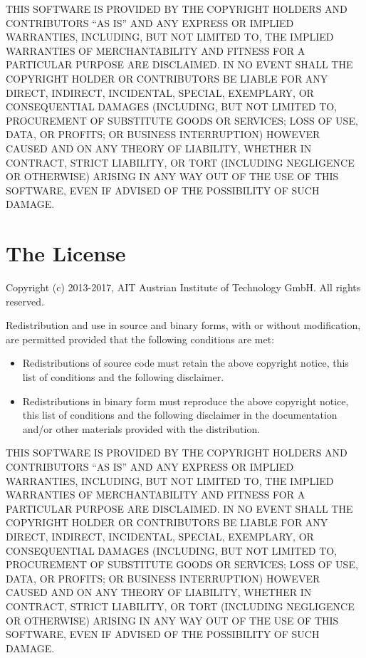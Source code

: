 THIS SOFTWARE IS PROVIDED BY THE COPYRIGHT HOLDERS AND CONTRIBUTORS ``AS
IS'' AND ANY EXPRESS OR IMPLIED WARRANTIES, INCLUDING, BUT NOT LIMITED
TO, THE IMPLIED WARRANTIES OF MERCHANTABILITY AND FITNESS FOR A
PARTICULAR PURPOSE ARE DISCLAIMED. IN NO EVENT SHALL THE COPYRIGHT
HOLDER OR CONTRIBUTORS BE LIABLE FOR ANY DIRECT, INDIRECT, INCIDENTAL,
SPECIAL, EXEMPLARY, OR CONSEQUENTIAL DAMAGES (INCLUDING, BUT NOT LIMITED
TO, PROCUREMENT OF SUBSTITUTE GOODS OR SERVICES; LOSS OF USE, DATA, OR
PROFITS; OR BUSINESS INTERRUPTION) HOWEVER CAUSED AND ON ANY THEORY OF
LIABILITY, WHETHER IN CONTRACT, STRICT LIABILITY, OR TORT (INCLUDING
NEGLIGENCE OR OTHERWISE) ARISING IN ANY WAY OUT OF THE USE OF THIS
SOFTWARE, EVEN IF ADVISED OF THE POSSIBILITY OF SUCH DAMAGE.


\section{The \fmipp License}
\label{fmipp_license}

Copyright (c) 2013-2017, AIT Austrian Institute of Technology GmbH. All
rights reserved.

Redistribution and use in source and binary forms, with or without
modification, are permitted provided that the following conditions are
met:

\begin{itemize}
\itemsep1pt\parskip0pt
\item
  Redistributions of source code must retain the above copyright notice,
  this list of conditions and the following disclaimer.
\item
  Redistributions in binary form must reproduce the above copyright
  notice, this list of conditions and the following disclaimer in the
  documentation and/or other materials provided with the distribution.
\end{itemize}

THIS SOFTWARE IS PROVIDED BY THE COPYRIGHT HOLDERS AND CONTRIBUTORS ``AS
IS'' AND ANY EXPRESS OR IMPLIED WARRANTIES, INCLUDING, BUT NOT LIMITED
TO, THE IMPLIED WARRANTIES OF MERCHANTABILITY AND FITNESS FOR A
PARTICULAR PURPOSE ARE DISCLAIMED. IN NO EVENT SHALL THE COPYRIGHT
HOLDER OR CONTRIBUTORS BE LIABLE FOR ANY DIRECT, INDIRECT, INCIDENTAL,
SPECIAL, EXEMPLARY, OR CONSEQUENTIAL DAMAGES (INCLUDING, BUT NOT LIMITED
TO, PROCUREMENT OF SUBSTITUTE GOODS OR SERVICES; LOSS OF USE, DATA, OR
PROFITS; OR BUSINESS INTERRUPTION) HOWEVER CAUSED AND ON ANY THEORY OF
LIABILITY, WHETHER IN CONTRACT, STRICT LIABILITY, OR TORT (INCLUDING
NEGLIGENCE OR OTHERWISE) ARISING IN ANY WAY OUT OF THE USE OF THIS
SOFTWARE, EVEN IF ADVISED OF THE POSSIBILITY OF SUCH DAMAGE.

